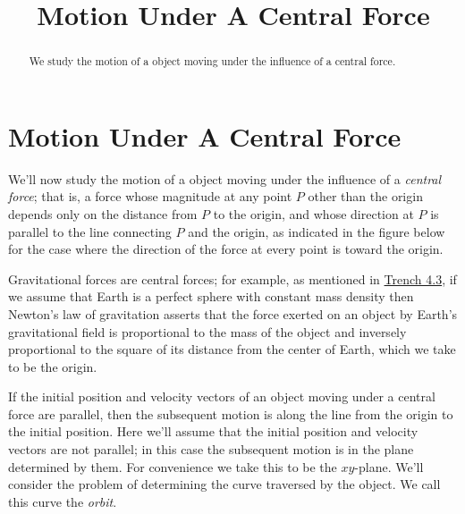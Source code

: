 \documentclass{ximera}
\title{Motion Under A Central Force}%
\begin{document}
\begin{abstract}
We study the motion of a object moving under the influence
of a central force.
\end{abstract}

\maketitle

\section*{Motion Under A Central Force}

We'll now study the motion of a object moving under the influence
of a \textit{central force}; that is, a force whose magnitude at any
point $P$ other than the origin depends only on the distance from
$P$ to the origin, and whose direction at $P$ is parallel to the line
connecting $P$ and the origin, as indicated in
the figure below for the case where the direction of the force
at every point is toward the origin.

\begin{center}
\end{center}


 Gravitational forces are central
forces;   for example, as mentioned in \href{https://ximera.osu.edu/ode/main/secondLawOfMotion/secondLawOfMotion}{Trench 4.3}, if we
assume that Earth is a perfect sphere with constant mass density then
Newton's law of gravitation asserts that the force exerted on an
object by Earth's gravitational field is proportional to the mass of
the object and inversely proportional to the square of its distance
from the center of Earth, which we take to be the origin.

If the initial position and velocity vectors of an object moving under
a central force are parallel, then the subsequent motion is along the
line from the origin to the initial position. Here we'll assume that
the initial position and velocity vectors are not parallel;   in this
case the subsequent motion is in the plane determined by them. For
convenience we take this to be the $xy$-plane. We'll
consider
the problem of determining the curve traversed by the object. We call
this curve the \textit{orbit}.
\end{document}
